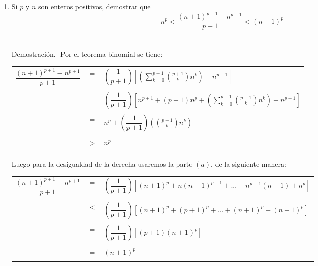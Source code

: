 \begin{enumerate}[ \bfseries 1.]
\begin{enumerate}[\bfseries (a)]
\item Si $p$ y $n$ son enteros positivos, demostrar que $$n^p < \dfrac{(n+1)^{p+1} - n^{p+1}}{p+1} < (n+1)^p$$\\\\
Demostración.- \; Por el teorema binomial se tiene:
\begin{center}
\begin{tabular}{rcl}
$\dfrac{(n+1)^{p+1} - n^{p+1}}{p+1}$&$=$&$\left( \dfrac{1}{p+1} \right) \left[ \left( \sum\limits_{k=0}^{p+1} {p+1 \choose k} n^k \right) - n^{p+1} \right]$\\\\
&$=$&$\left( \dfrac{1}{p+1} \right) \left[ n^{p+1} + (p+1)n^p + \left( \sum\limits_{k=0}^{p-1} {p+1 \choose k} n^k \right) - n^{p+1} \right]$\\\\
&$=$&$n^p + \left( \dfrac{1}{p+1} \right) \left( {p+1 \choose k} n^k \right)$\\\\
&$>$&$n^p$\\\\
\end{tabular}
\end{center}
Luego para la desigualdad de la derecha usaremos la parte $(a)$, de la siguiente manera:
\begin{center}
\begin{tabular}{rcl}
$\dfrac{(n+1)^{p+1} - n^{p+1}}{p+1}$&$=$&$\left( \dfrac{1}{p+1} \right)\left[ (n+1)^p + n(n+1)^{p-1} + ... + n^{p-1}(n+1) + n^p \right]$\\\\
&$<$&$\left( \dfrac{1}{p+1} \right)\left[ (n+1)^p + (p+1)^p + ... + (n+1)^p + (n+1)^p \right]$\\\\
&$=$&$\left( \dfrac{1}{p+1} \right) \left[ (p+1)(n+1)^p \right]$\\\\
&$=$&$(n+1)^p$\\\\
\end{tabular}
\end{center}


\end{enumerate}
\end{enumerate}
